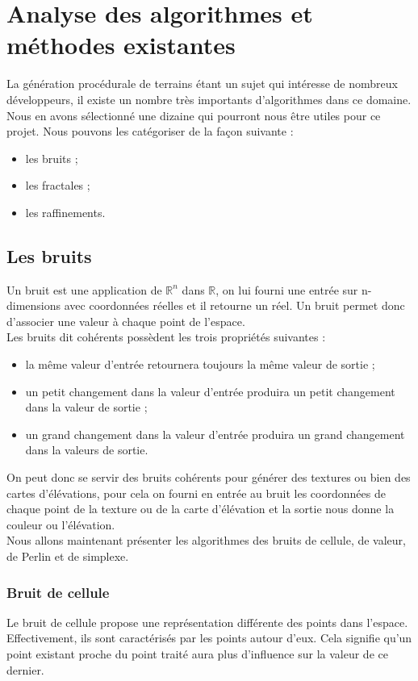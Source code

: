 \chapter{Analyse des algorithmes et méthodes existantes}
La génération procédurale de terrains étant un sujet qui intéresse de nombreux développeurs, il existe un nombre très importants d'algorithmes dans ce domaine. Nous en avons sélectionné une dizaine qui pourront nous \^etre utiles pour ce projet. Nous pouvons les catégoriser de la façon suivante :
\begin{itemize}
\item les bruits ;
\item les fractales ;
\item les raffinements.
\end{itemize}


\section{Les bruits}
Un bruit est une application de $\mathbb R^n$ dans $\mathbb R$, on lui fourni
une entrée sur n-dimensions avec coordonnées réelles et il retourne un réel.
Un bruit permet donc d'associer une valeur à chaque point de l'espace.\\

Les bruits dit cohérents possèdent les trois propriétés suivantes :
\begin{itemize}
\item la même valeur d'entrée retournera toujours la même valeur de sortie ;
\item un petit changement dans la valeur d'entrée produira un petit changement dans la valeur de sortie ;
\item un grand changement dans la valeur d'entrée produira un grand changement
dans la valeurs de sortie.\\
\end{itemize}

On peut donc se servir des bruits cohérents pour générer des textures ou
bien des cartes d'élévations, pour cela on fourni en entrée au bruit les
coordonnées de chaque point de la texture ou de la carte d'élévation
et la sortie nous donne la couleur ou l'élévation.\\
Nous allons maintenant présenter les algorithmes des bruits de cellule, de valeur, de Perlin et de simplexe.

\subsection{Bruit de cellule}
Le bruit de cellule propose une représentation différente des points dans l'espace. Effectivement, ils sont caractérisés par les points autour d'eux.
Cela signifie qu'un point existant proche du point traité aura plus d'influence sur la valeur de ce dernier.
